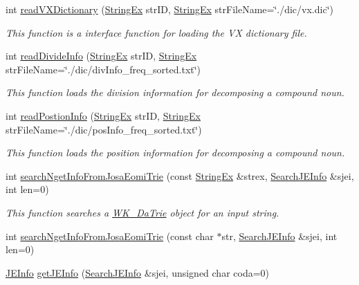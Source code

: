 \begin{CompactItemize}
int \hyperlink{classkmaOrange_1_1Dictionary_cae20d922b303760cf7f5328f1a8ac19}{readVXDictionary} (\hyperlink{classStringEx}{StringEx} strID, \hyperlink{classStringEx}{StringEx} strFileName=\char`\"{}./dic/vx.dic\char`\"{})
\begin{CompactList}\small\item\em This function is a interface function for loading the VX dictionary file. \item\end{CompactList}\item 
int \hyperlink{classkmaOrange_1_1Dictionary_d7bb7409e2b9a69319fb64a96d96543b}{readDivideInfo} (\hyperlink{classStringEx}{StringEx} strID, \hyperlink{classStringEx}{StringEx} strFileName=\char`\"{}./dic/divInfo\_\-freq\_\-sorted.txt\char`\"{})
\begin{CompactList}\small\item\em This function loads the division information for decomposing a compound noun. \item\end{CompactList}\item 
int \hyperlink{classkmaOrange_1_1Dictionary_676d4f45dcfe21f931a65e94b8f3467e}{readPostionInfo} (\hyperlink{classStringEx}{StringEx} strID, \hyperlink{classStringEx}{StringEx} strFileName=\char`\"{}./dic/posInfo\_\-freq\_\-sorted.txt\char`\"{})
\begin{CompactList}\small\item\em This function loads the position information for decomposing a compound noun. \item\end{CompactList}\item 
int \hyperlink{classkmaOrange_1_1Dictionary_750713534498c4d0676232a153d58593}{searchNgetInfoFromJosaEomiTrie} (const \hyperlink{classStringEx}{StringEx} \&strex, \hyperlink{classSearchJEInfo}{SearchJEInfo} \&sjei, int len=0)
\begin{CompactList}\small\item\em This function searches a \hyperlink{classkmaOrange_1_1WK__DaTrie}{WK\_\-DaTrie} object for an input string. \item\end{CompactList}\item 
int \hyperlink{classkmaOrange_1_1Dictionary_6236281c1997bd9f804082ba5647d12f}{searchNgetInfoFromJosaEomiTrie} (const char $\ast$str, \hyperlink{classSearchJEInfo}{SearchJEInfo} \&sjei, int len=0)
\item 
\hyperlink{classJEInfo}{JEInfo} \hyperlink{classkmaOrange_1_1Dictionary_ff02492cac6fecda2e4fa7c1064752c3}{getJEInfo} (\hyperlink{classSearchJEInfo}{SearchJEInfo} \&sjei, unsigned char coda=0)

\end{CompactItemize}

